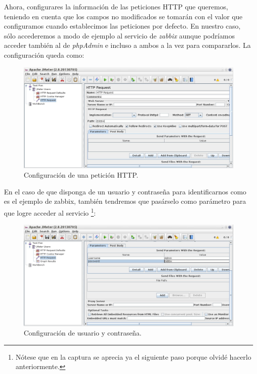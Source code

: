 \documentclass[paper=a4, fontsize=11pt]{scrartcl} %
\numberwithin{equation}{section} %
\numberwithin{figure}{section} %
\numberwithin{table}{section} %
\begin{document}
\begin{enumerate}
		Ahora, configurares la información de las peticiones HTTP que queremos, teniendo en cuenta que
		los campos no modificados se tomarán con el valor que configuramos cuando establecimos las
		peticiones por defecto. En nuestro caso, sólo accederemos a modo de ejemplo al servicio de
		\textit{zabbix} aunque podríamos acceder también al de \textit{phpAdmin} e incluso a ambos a
		la vez para compararlos. La configuración queda como: 
		
		\begin{figure}[H]
			\centering
			\includegraphics[width=15cm]{Ejercicio_7g.jpg}
			\caption{Configuración de una petición HTTP.}
			\label{fig:http_request}
		\end{figure}
		
		En el caso de que disponga de un usuario y contraseña para identificarnos como es el ejemplo
		de zabbix, también tendremos que pasárselo como parámetro para que logre acceder al servicio
		\footnote{Nótese que en la captura se aprecia ya el siguiente paso porque olvidé hacerlo
		anteriormente.}:
		
		\begin{figure}[H]
			\centering
			\includegraphics[width=15cm]{Ejercicio_7h.jpg}
			\caption{Configuración de usuario y contraseña.}
			\label{fig:http_login}
		\end{figure}
		

\end{enumerate}
\end{document}
